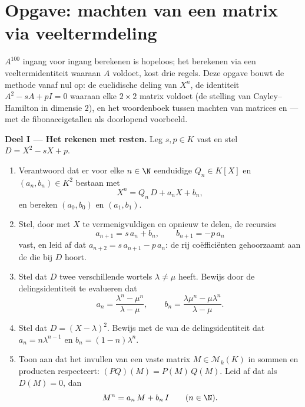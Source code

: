 \section{Opgave: machten van een matrix via veeltermdeling}

\begin{problem}\label{pb:b1:matrices:1}
$A^{100}$ ingang voor ingang berekenen is hopeloos; het berekenen
via een veeltermidentiteit waaraan $A$ voldoet, kost drie regels.
Deze opgave bouwt de methode vanaf nul op: de euclidische deling
van $X^n$, de identiteit $A^2 - sA + pI = 0$ waaraan elke $2 \times
2$ matrix voldoet (de stelling van Cayley--Hamilton in dimensie
$2$), en het woordenboek tussen machten van matrices en  --- met de fibonaccigetallen als doorlopend
voorbeeld.

\medskip
\noindent\textbf{Deel I --- Het rekenen met resten.} Leg $s, p \in
K$ vast en stel $D = X^2 - sX + p$.
\begin{enumerate}
  \item Verantwoord dat er voor elke $n \in \N$ eenduidige $Q_n \in
        K[X]$ en $(a_n, b_n) \in K^2$ bestaan met
        \[
        X^n = Q_n\,D + a_n X + b_n ,
        \]
        en bereken $(a_0, b_0)$ en $(a_1, b_1)$.
  \item Stel, door met $X$ te vermenigvuldigen en opnieuw te delen,
        de recursies
        \[
        a_{n+1} = s\,a_n + b_n,
        \qquad
        b_{n+1} = -p\,a_n
        \]
        vast, en leid af dat $a_{n+2} = s\,a_{n+1} - p\,a_n$: de rij
        coëfficiënten gehoorzaamt aan de  die
        bij $D$ hoort.
  \item Stel dat $D$ twee verschillende wortels $\lambda \neq \mu$
        heeft. Bewijs door de delingsidentiteit te evalueren dat
        \[
        a_n = \frac{\lambda^n - \mu^n}{\lambda - \mu},
        \qquad
        b_n = \frac{\lambda\mu^n - \mu\lambda^n}{\lambda - \mu} .
        \]
  \item Stel dat $D = (X - \lambda)^2$. Bewijs met de  van
        de delingsidentiteit dat $a_n = n\lambda^{n-1}$ en $b_n =
        (1 - n)\lambda^{n}$.
  \item Toon aan dat het invullen van een vaste matrix $M \in
        \mathcal{M}_k(K)$ in  sommen en producten
        respecteert: $(PQ)(M) = P(M)\,Q(M)$. Leid af dat als $D(M)
        = 0$, dan
        \[
        M^n = a_n\,M + b_n\,I \qquad (n \in \N).
        \]
\end{enumerate}


\end{problem}
